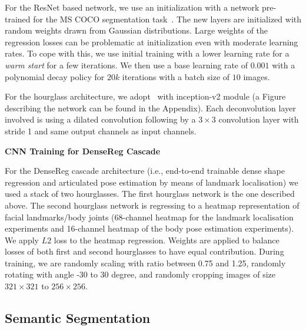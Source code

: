 For the ResNet based network, we use an initialization with a network pre-trained for the MS COCO segmentation task~\cite{lin2014microsoft}. The new layers are initialized with random weights drawn from Gaussian distributions. Large weights of the regression losses can be problematic at initialization even with moderate learning rates. To cope with this, we use initial training with a lower learning rate for a \textit{warm start} for a few iterations. We then use a base learning rate of $0.001$ with a polynomial decay policy for $20k$ iterations with a batch size of $10$ images.

For the hourglass architecture, we adopt~\cite{newell2016stacked} with inception-v2 module (a Figure describing the network can be found in the Appendix). Each deconvolution layer involved is using a dilated convolution following by a $3\times 3$ convolution layer with stride 1 and same output channels as input channels. 


\textbf{CNN Training for DenseReg Cascade} 

For the DenseReg cascade architecture (i.e., end-to-end trainable dense shape regression and articulated pose estimation by means of landmark localisation) we used a stack of two hourglasses. The first hourglass network is the one described above. The second hourglass network is regressing to a  heatmap representation of facial landmarks/body joints (68-channel heatmap for the landmark localisation experiments and 16-channel heatmap of the body pose estimation experiments). We apply $L2$ loss to the heatmap regression. Weights are applied to balance losses of both first and second hourglasses to have equal contribution. During training, we are randomly scaling with ratio between 0.75 and 1.25, randomly rotating with angle -30 to 30 degree, and randomly cropping images of size $321\times321$ to $256\times256$.

\subsection{Semantic Segmentation}
\label{sec:exp_semantic_segmentation}


